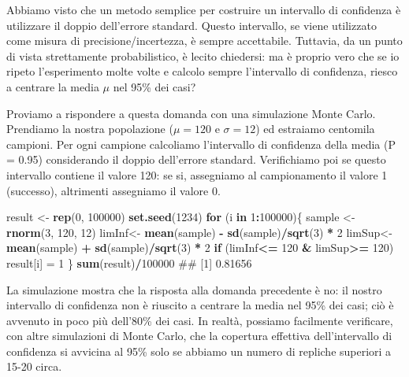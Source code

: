 \documentclass[a4paper,12pt,oneside]{book}
\newenvironment{Shaded}{\begin{snugshade}}{\end{snugshade}}
\newcommand{\KeywordTok}[1]{\textcolor[rgb]{0.13,0.29,0.53}{\textbf{#1}}}
\newcommand{\DecValTok}[1]{\textcolor[rgb]{0.00,0.00,0.81}{#1}}
\newcommand{\StringTok}[1]{\textcolor[rgb]{0.31,0.60,0.02}{#1}}
\newcommand{\ControlFlowTok}[1]{\textcolor[rgb]{0.13,0.29,0.53}{\textbf{#1}}}
\newcommand{\OperatorTok}[1]{\textcolor[rgb]{0.81,0.36,0.00}{\textbf{#1}}}
\newcommand{\NormalTok}[1]{#1}
\theoremstyle{definition}
\theoremstyle{definition}
\theoremstyle{definition}
\theoremstyle{remark}
\begin{document}
Abbiamo visto che un metodo semplice per costruire un intervallo di
confidenza è utilizzare il doppio dell'errore standard. Questo
intervallo, se viene utilizzato come misura di precisione/incertezza, è
sempre accettabile. Tuttavia, da un punto di vista strettamente
probabilistico, è lecito chiedersi: ma è proprio vero che se io ripeto
l'esperimento molte volte e calcolo sempre l'intervallo di confidenza,
riesco a centrare la media \(\mu\) nel 95\% dei casi?

Proviamo a rispondere a questa domanda con una simulazione Monte Carlo.
Prendiamo la nostra popolazione (\(\mu = 120\) e \(\sigma = 12\)) ed
estraiamo centomila campioni. Per ogni campione calcoliamo l'intervallo
di confidenza della media (P = 0.95) considerando il doppio dell'errore
standard. Verifichiamo poi se questo intervallo contiene il valore 120:
se si, assegniamo al campionamento il valore 1 (successo), altrimenti
assegniamo il valore 0.

\begin{Shaded}
\begin{Highlighting}[]
\NormalTok{result <-}\StringTok{ }\KeywordTok{rep}\NormalTok{(}\DecValTok{0}\NormalTok{, }\DecValTok{100000}\NormalTok{)}
\KeywordTok{set.seed}\NormalTok{(}\DecValTok{1234}\NormalTok{)}
\ControlFlowTok{for}\NormalTok{ (i }\ControlFlowTok{in} \DecValTok{1}\OperatorTok{:}\DecValTok{100000}\NormalTok{)\{}
\NormalTok{  sample <-}\StringTok{ }\KeywordTok{rnorm}\NormalTok{(}\DecValTok{3}\NormalTok{, }\DecValTok{120}\NormalTok{, }\DecValTok{12}\NormalTok{)}
\NormalTok{  limInf<-}\StringTok{ }\KeywordTok{mean}\NormalTok{(sample) }\OperatorTok{-}\StringTok{ }\KeywordTok{sd}\NormalTok{(sample)}\OperatorTok{/}\KeywordTok{sqrt}\NormalTok{(}\DecValTok{3}\NormalTok{) }\OperatorTok{*}\StringTok{ }\DecValTok{2} 
\NormalTok{  limSup<-}\StringTok{ }\KeywordTok{mean}\NormalTok{(sample) }\OperatorTok{+}\StringTok{ }\KeywordTok{sd}\NormalTok{(sample)}\OperatorTok{/}\KeywordTok{sqrt}\NormalTok{(}\DecValTok{3}\NormalTok{) }\OperatorTok{*}\StringTok{ }\DecValTok{2}
  \ControlFlowTok{if}\NormalTok{ (limInf}\OperatorTok{<=}\StringTok{ }\DecValTok{120} \OperatorTok{&}\StringTok{ }\NormalTok{limSup}\OperatorTok{>=}\StringTok{ }\DecValTok{120}\NormalTok{) result[i] =}\StringTok{ }\DecValTok{1}
\NormalTok{\}}
\KeywordTok{sum}\NormalTok{(result)}\OperatorTok{/}\DecValTok{100000}
\NormalTok{## [1] 0.81656}
\end{Highlighting}
\end{Shaded}

La simulazione mostra che la risposta alla domanda precedente è no: il
nostro intervallo di confidenza non è riuscito a centrare la media nel
95\% dei casi; ciò è avvenuto in poco più dell'80\% dei casi. In realtà,
possiamo facilmente verificare, con altre simulazioni di Monte Carlo,
che la copertura effettiva dell'intervallo di confidenza si avvicina al
95\% solo se abbiamo un numero di repliche superiori a 15-20 circa.
\end{document}
